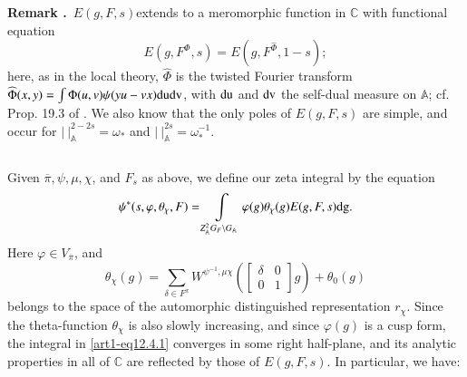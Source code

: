 \medskip
\noindent
{\bf Remark .\label{art1-rem12.3}}~$E(g,F,s)$\pageoriginale extends to a meromorphic function in $\mathbb{C}$ with functional equation
\setcounter{equation}{0}
\begin{equation}
E(g,F^{\Phi},s)=E(g,F^{\widehat{\Phi}},1-s);\label{art1-eq12.3.1}
\end{equation}
here, as in the local theory, $\widehat{\Phi}$ is the twisted Fourier transform $\widehat{\Phi}(x,y)=\int\Phi(u,v)\psi(yu-vx)\mathrm{du} \mathrm{dv}$, with $\mathrm{du}$ and $\mathrm{dv}$ the self-dual measure on $\mathbb{A}$; cf. Prop. 19.3 of \cite{Ja}. We also know that the only poles of $E(g,F,s)$ are simple, and occur for $|~|^{2-2s}_{\mathbb{A}}=\omega_{*}$ and $|~|^{2s}_{\mathbb{A}}=\omega^{-1}_{*}$.

\setcounter{subsection}{3}
\subsection{}\label{art1-sec12.4}
Given $\overline{\pi},\psi,\mu,\chi$, and $F_{s}$ as above, we define our zeta integral by the equation
\setcounter{equation}{0}
\begin{equation}
\psi^{*}(s,\varphi,\theta_{\chi},F)=\int\limits_{Z^{2}_{\mathbb{A}}G_{F}\backslash G_{\mathbb{A}}}\varphi(g)\theta_{\chi}(g)E(g,F,s)\mathrm{dg}.\label{art1-eq12.4.1}
\end{equation}
Here $\varphi\in V_{\overline{\pi}}$, and
\begin{equation}
\theta_{\chi}(g)=\sum\limits_{\delta\in F^{x}}W^{\psi^{-1},\mu\chi}\left(\begin{bmatrix} \delta & 0\\ 0 & 1\end{bmatrix}g\right)+\theta_{0}(g)\label{art1-eq12.4.2}
\end{equation}
belongs to the space of the automorphic distinguished representation $r_{\chi}$. Since the theta-function $\theta_{\chi}$ is also slowly increasing, and since $\varphi(g)$ is a cusp form, the integral in \eqref{art1-eq12.4.1} converges in some right half-plane, and its analytic properties in all of $\mathbb{C}$ are reflected by those of $E(g,F,s)$. In particular, we have:

\newpage


